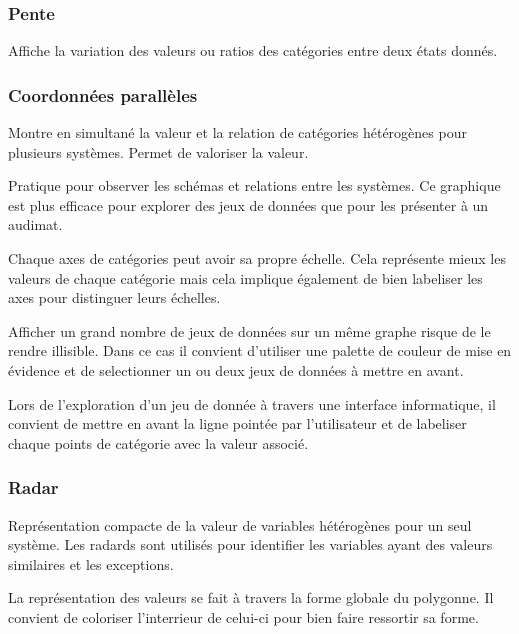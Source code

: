 \documentclass[a4paper,12pt]{article}
\begin{document}
\begin{multicols}{2}
\subsubsection{Pente}
\label{sec:org76247e6}
Affiche la variation des valeurs ou ratios des catégories entre deux états donnés. \autocite{alansmithLexiqueVisuel}
\subsubsection{Coordonnées parallèles}
\label{sec:orgb04fb8d}
Montre en simultané la valeur et la relation de catégories hétérogènes pour plusieurs systèmes. \autocite{jonathanschwabishRelationship2021} Permet de valoriser la valeur. \autocite{alansmithLexiqueVisuel}

Pratique pour observer les schémas et relations entre les systèmes. \autocite{mikeyiHowChooseRight2020} Ce graphique est plus efficace pour explorer des jeux de données que pour les présenter à un audimat. \autocite{sosulskiGraphics2019}

Chaque axes de catégories peut avoir sa propre échelle. Cela représente mieux les valeurs de chaque catégorie mais cela implique également de bien labeliser les axes pour distinguer leurs échelles. \autocite{jonathanschwabishRelationship2021}

Afficher un grand nombre de jeux de données sur un même graphe risque de le rendre illisible. \autocite{jonathanschwabishRelationship2021} Dans ce cas il convient d'utiliser une palette de couleur de mise en évidence et de selectionner un ou deux jeux de données à mettre en avant.

Lors de l'exploration d'un jeu de donnée à travers une interface informatique, il convient de mettre en avant la ligne pointée par l'utilisateur et de labeliser chaque points de catégorie avec la valeur associé. \autocite{sosulskiGraphics2019}
\subsubsection{Radar}
\label{sec:orgc2cfd5f}
Représentation compacte de la valeur de variables hétérogènes pour un seul système. \autocite{alansmithLexiqueVisuel} Les radards sont utilisés pour identifier les variables ayant des valeurs similaires et les exceptions. \autocite{sosulskiGraphics2019}

La représentation des valeurs se fait à travers la forme globale du polygonne. Il convient de coloriser l'interrieur de celui-ci pour bien faire ressortir sa forme. \autocite{jonathanschwabishRelationship2021}


\end{multicols}
\end{document}
